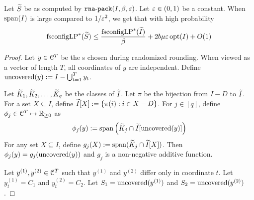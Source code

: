 \begin{lemma}
\label{thm:fclp-conc}
Let $\widetilde{S}$ be as computed by $\operatorname{\mathtt{rna-pack}}(I, \beta, \varepsilon)$. Let $\varepsilon \in (0, 1)$ be a constant.
When $\operatorname{span}(I)$ is large compared to $1/\varepsilon^2$, we get that with high probability
\[ \operatorname{fsconfigLP}^*(\widetilde{S}) \le \frac{\operatorname{fsconfigLP}^*(\widetilde{I})}{\beta} + 2b\mu\varepsilon\operatorname{opt}(I) + O(1) \]
\end{lemma}
\begin{proof}
Let $y \in \mathcal{C}^T$ be the \config{}s chosen during randomized rounding.
When viewed as a vector of length $T$, all coordinates of $y$ are independent.
Define $\operatorname{uncovered}(y) := I - \bigcup_{t=1}^T y_t$.

Let $\widetilde{K}_1, \widetilde{K}_2, \ldots, \widetilde{K}_q$ be the classes of $\widetilde{I}$.
Let $\pi$ be the bijection from $I-D$ to $\widetilde{I}$.
For a set $X \subseteq I$, define $\widetilde{I}[X] := \{\pi(i): i \in X-D\}$.
For $j \in [q]$, define $\phi_j \in \mathcal{C}^T \mapsto \mathbb{R}_{\ge 0}$ as
\[ \phi_j(y) := \operatorname{span}\left(\widetilde{K}_j \cap \widetilde{I}[\operatorname{uncovered}(y)]\right) \]
For any set $X \subseteq I$, define $g_j(X) := \operatorname{span}(\widetilde{K}_j \cap \widetilde{I}[X])$.
Then $\phi_j(y) = g_j(\operatorname{uncovered}(y))$ and $g_j$ is a non-negative additive function.

Let $y^{(1)}, y^{(2)} \in \mathcal{C}^T$ such that
$y^{(1)}$ and $y^{(2)}$ differ only in coordinate $t$.
Let $y^{(1)}_t = C_1$ and $y^{(2)}_t = C_2$.
Let $S_1 = \operatorname{uncovered}(y^{(1)})$ and $S_2 = \operatorname{uncovered}(y^{(2)})$.


\end{proof}

